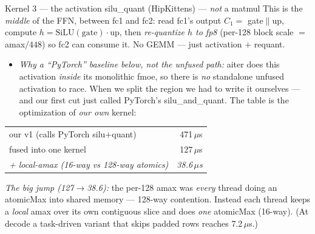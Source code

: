 \documentclass[pdf,aspectratio=169]{beamer}
\newcommand{\empy}[1]{{\color{darkorange}\emph{#1}}}
\newcommand{\empr}[1]{{\color{cardinalred}\emph{#1}}}
\newcommand{\mc}[1]{{\ttfamily\small #1}}
\begin{document}
\begin{frame}{Kernel 3 --- the activation \mc{silu\_quant} (HipKittens) --- \emph{not} a matmul}
\footnotesize
This is the \emph{middle} of the FFN, between fc1 and fc2: read fc1's output $C_1=$ gate$\|$up, compute $h=\mathrm{SiLU}(\text{gate})\cdot\text{up}$, then \empy{re-quantize $h$ to fp8} (per-128 block scale $=$ amax$/448$) so fc2 can consume it. No GEMM --- just activation $+$ requant.
\begin{itemize}\footnotesize
  \item \empr{Why a ``PyTorch'' baseline below, not the unfused path:} aiter does this activation \emph{inside} its monolithic \mc{fmoe}, so there is \emph{no} standalone unfused activation to race. When we split the region we had to write it ourselves --- and our first cut just called PyTorch's \mc{silu\_and\_quant}. The table is the optimization of \emph{our own} kernel:
\end{itemize}
\begin{center}\scriptsize
\begin{tabular}{lr}
\toprule
our v1 (calls PyTorch silu$+$quant) & 471\,$\mu$s \\
fused into one kernel & 127\,$\mu$s \\
\empy{+ local-amax (16-way vs 128-way atomics)} & \empr{38.6\,$\mu$s} \\
\bottomrule
\end{tabular}
\end{center}
\empr{The big jump (127$\to$38.6):} the per-128 amax was \emph{every} thread doing an \mc{atomicMax} into shared memory --- 128-way contention. Instead each thread keeps a \emph{local} amax over its own contiguous slice and does \emph{one} \mc{atomicMax} (16-way). (At decode a task-driven variant that skips padded rows reaches 7.2\,$\mu$s.)
\end{frame}
\end{document}
